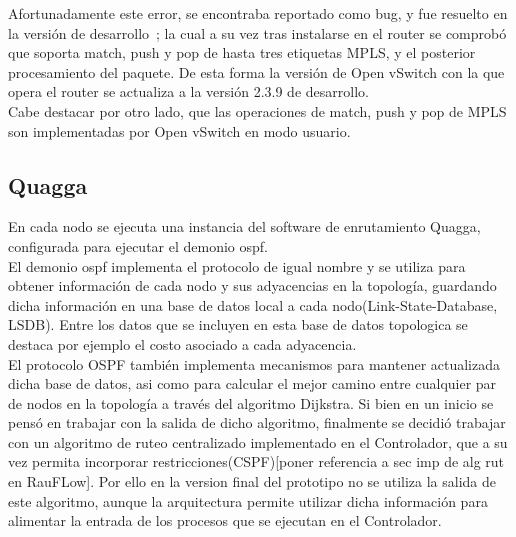 Afortunadamente este error, se encontraba reportado como bug, y fue resuelto en la versi\'on de desarrollo~\citep{OVSSourceCode}; la cual a su vez tras instalarse en el router se comprobó que soporta match, push y pop de hasta tres etiquetas MPLS, y el posterior procesamiento del paquete. De esta forma la versi\'on de Open vSwitch con la que opera el router se actualiza a la versi\'on 2.3.9 de desarrollo.\\

Cabe destacar por otro lado, que las operaciones de match, push y pop de MPLS son implementadas por Open vSwitch en modo usuario.


\subsection{Quagga}
En cada nodo se ejecuta una instancia del software de enrutamiento Quagga, configurada para ejecutar el demonio ospf.\\ 

El demonio ospf implementa el protocolo de igual nombre y se utiliza para obtener información de cada nodo y sus adyacencias en la topolog\'ia, guardando dicha información en una base de datos local a cada nodo(Link-State-Database, LSDB). Entre los datos que se incluyen en esta base de datos topologica se destaca por ejemplo el costo asociado a cada adyacencia.\\ 

El protocolo OSPF también implementa mecanismos para mantener actualizada dicha base de datos, asi como para calcular el mejor camino entre cualquier par de nodos en la topolog\'ia a través del algoritmo Dijkstra. Si bien en un inicio se pensó en trabajar con la salida de dicho algoritmo, finalmente se decidió trabajar con un algoritmo de ruteo centralizado implementado en el Controlador, que a su vez permita incorporar restricciones(CSPF)[poner referencia a sec imp de alg rut en RauFLow]. Por ello en la version final del prototipo no se utiliza la salida de este algoritmo, aunque la arquitectura permite utilizar dicha información para alimentar la entrada de los procesos que se ejecutan en el Controlador.\\

